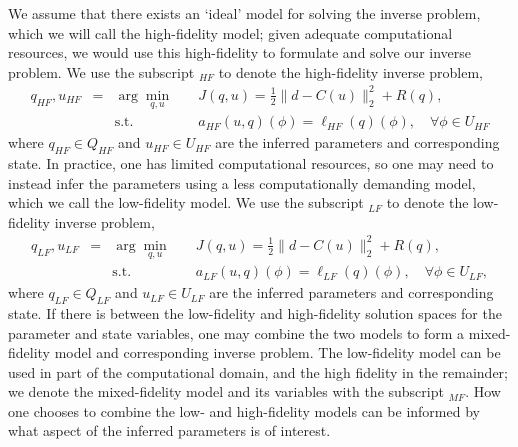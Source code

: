 We assume that there exists an `ideal' model for solving the inverse problem, which we will call the high-fidelity model; given adequate computational resources, we would use this high-fidelity to formulate and solve our inverse problem. We use the subscript $_{HF}$ to denote the high-fidelity inverse problem,
%
\begin{subequations}
\label{eq:invOptHF}
\begin{align}
q_{HF},u_{HF} &=&\arg\min\limits_{q,u} & \quad J(q,u)=\frac{1}{2}\|d-C(u)\|_2^2 + R(q), \label{eq:invOpt_objHF} \\
&&\textrm{s.t. }& \quad a_{HF}(u,q)(\phi)=\ell_{HF}(q)(\phi),\quad\forall\phi\in U_{HF} \label{eq:invOpt_consHF}
\end{align}
\end{subequations}
%
where $q_{HF} \in Q_{HF}$ and $u_{HF}\in U_{HF}$ are the inferred parameters and corresponding state. In practice, one has limited computational resources, so one may need to instead infer the parameters using a less computationally demanding model, which we call the low-fidelity model. We use the subscript $_{LF}$ to denote the low-fidelity inverse problem,
%
\begin{subequations}
\label{eq:invOptLF}
\begin{align}
q_{LF},u_{LF} &=& \arg\min\limits_{q,u} & \quad J(q,u)=\frac{1}{2}\|d-C(u)\|_2^2 + R(q), \label{eq:invOpt_objLF} \\
&& \textrm{s.t. }& \quad a_{LF}(u,q)(\phi)=\ell_{LF}(q)(\phi),\quad\forall\phi\in U_{LF}, \label{eq:invOpt_consLF}
\end{align}
\end{subequations}
%
where $q_{LF} \in Q_{LF}$ and $u_{LF}\in U_{LF}$ are the inferred parameters and corresponding state. If there is  between the low-fidelity and high-fidelity solution spaces for the parameter and state variables, one may combine the two models to form a mixed-fidelity model and corresponding inverse problem. The low-fidelity model can be used in part of the computational domain, and the high fidelity in the remainder; we denote the mixed-fidelity model and its variables with the subscript $_{MF}$. How one chooses to combine the low- and high-fidelity models can be informed by what aspect of the inferred parameters is of interest.

